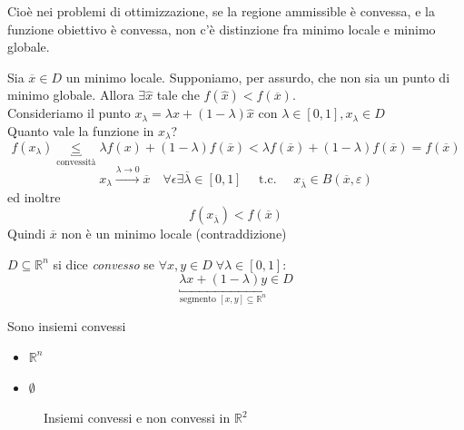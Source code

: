 Cioè nei problemi di ottimizzazione, se la regione ammissible è convessa,
e la funzione obiettivo \`e convessa, non c'\`e distinzione fra minimo locale e 
minimo globale.
\begin{thproof}

 Sia $\overline{x} \in D$ un minimo locale. Supponiamo, per assurdo,
che non sia un punto di minimo globale. Allora $\exists \hat{x}$ tale 
che $f(\hat{x}) < f(\overline{x})$. \\
Consideriamo il punto $x_{\lambda} = \lambda x + (1-\lambda)\hat{x}$
con $\lambda \in [0,1],  x_{\lambda} \in D$\\
Quanto vale la funzione in $x_{\lambda}$?
 $$f(x_{\lambda}) \underbracket{\leq}_{\text{convessit\`a}}  \lambda f(x) +
 (1-\lambda)f(\overline{x}) < \lambda f(\overline{x})
 + (1-\lambda) f(\overline{x})
 = f(\overline{x})$$
 $$ x_{\lambda} \xrightarrow{\lambda \rightarrow 0} \overline{x} \quad
  \forall \epsilon  \exists  \overline{\lambda} \in [0,1] \quad 
 \text{ t.c. }  \quad x_{\overline{\lambda}} \in  B(\overline{x}, \varepsilon)$$
ed inoltre
$$ f(x_{\overline{\lambda}}) < f(\overline{x})$$
Quindi $\overline{x}$ non \`e un minimo locale (contraddizione)
\end{thproof}

\begin{defn}
 $D \subseteq \mathbb{R}^{n}$ si dice \emph{convesso} se 
$\forall x,y \in D \; \forall \lambda \in [0,1]$:
$$ \underbracket{\lambda x + (1-\lambda)y}_{\text{segmento }  [x,y] \subseteq \mathbb{R}^{n}}\in D $$
\end{defn}

\begin{observation}
 Sono insiemi convessi
 \begin{itemize}
 \item $\mathbb{R}^{n}$
 \item $\emptyset$
 \end{itemize}
\end{observation}

\begin{figure}
  \centering
  \caption{Insiemi convessi e non convessi in $\mathbb{R}^2$}
  \label{fig:convexsets}
\end{figure}

